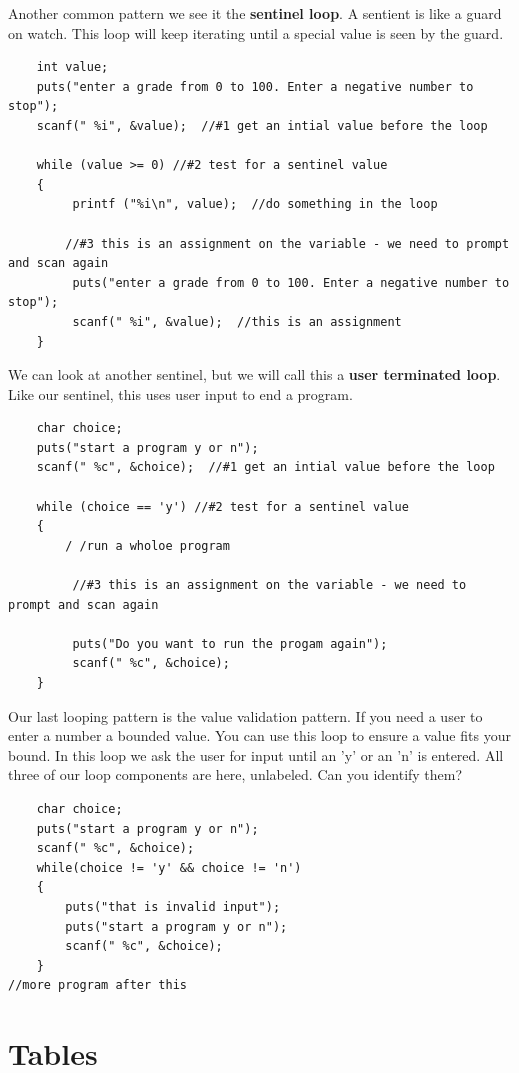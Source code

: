 Another common pattern we see it the {\bf sentinel loop}. A sentient is like a guard on watch. This loop will keep iterating until a special value is seen by the guard.  
\begin{verbatim}
 	int value;
 	puts("enter a grade from 0 to 100. Enter a negative number to stop");
 	scanf(" %i", &value);  //#1 get an intial value before the loop
	
 	while (value >= 0) //#2 test for a sentinel value
 	{
	  	 printf ("%i\n", value);  //do something in the loop
		
	    //#3 this is an assignment on the variable - we need to prompt and scan again
	     puts("enter a grade from 0 to 100. Enter a negative number to stop");
	     scanf(" %i", &value);  //this is an assignment
 	}
\end{verbatim}
%
We can look at another sentinel, but we will call this a {\bf user terminated loop}. Like our sentinel, this uses user input to end a program.
\begin{verbatim}
	char choice;
	puts("start a program y or n");
	scanf(" %c", &choice);  //#1 get an intial value before the loop
	
	while (choice == 'y') //#2 test for a sentinel value
	{
		/ /run a wholoe program
		
		 //#3 this is an assignment on the variable - we need to prompt and scan again
		
		 puts("Do you want to run the progam again");
		 scanf(" %c", &choice); 
	}
\end{verbatim}
%
Our last looping pattern is the value validation pattern. If you need a user to enter a number a bounded value. You can use this loop to ensure a value fits your bound.  In this loop we ask the user for input until an 'y' or an 'n' is entered. All three of our loop components are here, unlabeled. Can you identify them?
\begin{verbatim}
	char choice;
	puts("start a program y or n");
	scanf(" %c", &choice);  
	while(choice != 'y' && choice != 'n')
	{
		puts("that is invalid input");
		puts("start a program y or n");
		scanf(" %c", &choice);  
	}	
//more program after this
\end{verbatim}
%

\section{Tables}

